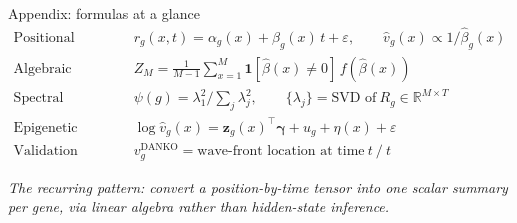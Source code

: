 \documentclass[aspectratio=169,11pt]{beamer}
\begin{document}
\begin{frame}{Appendix: formulas at a glance}
\vspace{0.6em}
\color{KWhite}\small
\begin{align*}
\text{Positional regression:}\quad &
   r_g(x,t) = \alpha_g(x) + \beta_g(x)\,t + \varepsilon,\qquad
   \widehat v_g(x) \propto 1/\widehat\beta_g(x) \\[0.3em]
\text{Algebraic diversity:}\quad &
   Z_M = \tfrac{1}{M-1}\sum_{x=1}^{M} \mathbf{1}[\widehat\beta(x)\ne 0]\,f(\widehat\beta(x)) \\[0.3em]
\text{Spectral concentration:}\quad &
   \psi(g) = \lambda_1^2 \big/ \textstyle\sum_j \lambda_j^2,\qquad
   \{\lambda_j\} = \text{SVD of}\ R_g \in \mathbb{R}^{M\times T} \\[0.3em]
\text{Epigenetic model:}\quad &
   \log \widehat v_g(x) = \mathbf{z}_g(x)^{\!\top}\boldsymbol\gamma + u_g + \eta(x) + \varepsilon \\[0.3em]
\text{Validation anchor:}\quad &
   v_g^{\text{DANKO}} = \text{wave-front location at time}\ t\ \big/\ t
\end{align*}
\vspace{0.8em}
\begin{center}
  {\color{KCream}\itshape The recurring pattern: convert a position-by-time tensor into one scalar summary per gene, via linear algebra rather than hidden-state inference.}
\end{center}
\end{frame}
\end{document}
